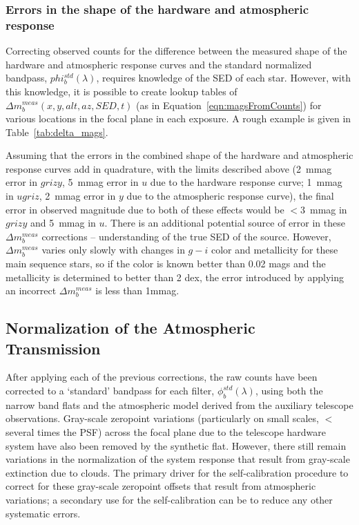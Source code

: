 \documentclass[12pt,preprint]{aastex}
\begin{document}
\subsubsection{Errors in the shape of the hardware and atmospheric response}
\label{sec:apply_deltak}

Correcting observed counts for the difference between the measured
shape of the hardware and atmospheric response curves and the standard
normalized bandpass, $phi_b^{std}(\lambda)$, requires knowledge of the
SED of each star. However, with this knowledge, it is possible to
create lookup tables of $\Delta m_b^{meas}(x,y,alt,az,SED,t)$ (as in
Equation~\ref{eqn:magsFromCounts}) for various locations in the focal
plane in each exposure. A rough example is given in
Table~\ref{tab:delta_mags}.

Assuming that the errors in the combined shape of the hardware and
atmospheric response curves add in quadrature, with the limits
described above (2~mmag error in $grizy$, 5~mmag error in $u$ due to
the hardware response curve; 1~mmag in $ugriz$, 2~mmag error in $y$
due to the atmospheric response curve), the final error in observed
magnitude due to both of these effects would be $<3$~mmag in $grizy$
and 5~mmag in $u$. There is an additional potential source of error in
these $\Delta m_b^{meas}$ corrections -- understanding of the true SED
of the source.  However, $\Delta m_b^{meas}$ varies only slowly with
changes in $g-i$ color and metallicity for these main sequence stars,
so if the color is known better than 0.02 mags and the metallicity is
determined to better than 2 dex, the error introduced by applying an
incorrect $\Delta m_b^{meas}$ is less than 1mmag.

\subsection{Normalization of the Atmospheric Transmission}
\label{sec:atmo_norm}

After applying each of the previous corrections, the raw counts have
been corrected to a `standard' bandpass for each filter,
$\phi_b^{std}(\lambda)$, using both the narrow band flats and the
atmospheric model derived from the auxiliary telescope
observations. Gray-scale zeropoint variations (particularly on small
scales, $<$ several times the PSF) across the focal plane due to the
telescope hardware system have also been removed by the synthetic
flat. However, there still remain variations in the normalization of
the system response that result from gray-scale extinction due to
clouds. The primary driver for the self-calibration procedure to
correct for these gray-scale zeropoint offsets that result from
atmospheric variations; a secondary use for the self-calibration can
be to reduce any other systematic errors. 
\end{document}
